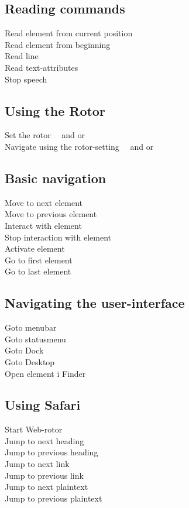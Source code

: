 \documentclass[a4paper, landscape, 11pt]{scrartcl}
\newcommand{\command}[2]{#1~\dotfill{}~#2\\} %
\begin{document}
\begin{multicols}{2}
\subsection*{Reading commands}
\command{Read element from current position}{}
\command{Read element from beginning}{}
\command{Read line}{}
\command{Read text-attributes}{}
\command{Stop speech}{\keys{\ctrl}}

\subsection*{Using the Rotor}
\command{Set the rotor}{ and \keys{\arrowkeyleft} or \keys{\arrowkeyright}}
\command{Navigate using the rotor-setting}{\keys{VO + \cmd} and \keys{\arrowkeydown} or \keys{\arrowkeyup}}

\subsection*{Basic navigation}
\command{Move to next element}{}
\command{Move to previous element}{}
\command{Interact with element}{\keys{VO + \shift + \arrowkeydown}}
\command{Stop interaction with element}{\keys{VO + \shift + \arrowkeyup}}
\command{Activate element}{}
\command{Go to first element}{\keys{VO + \cmd + fn + \arrowkeyleft}}
\command{Go to last element}{\keys{VO + \cmd + fn + \arrowkeyright}}

\subsection*{Navigating the user-interface}
\command{Goto menubar}{}
\command{Goto statusmenu}{}
\command{Goto Dock}{}
\command{Goto Desktop}{}
\command{Open element i Finder}{}

\subsection*{Using Safari}
\command{Start Web-rotor}{}
\command{Jump to next heading}{}
\command{Jump to previous heading}{}
\command{Jump to next link}{}
\command{Jump to previous link}{\keys{VO + \cmd + \shift + h }}
\command{Jump to next plaintext}{}
\command{Jump to previous plaintext}{\keys{VO + \cmd + \shift + p }}


\end{multicols}
\end{document}
